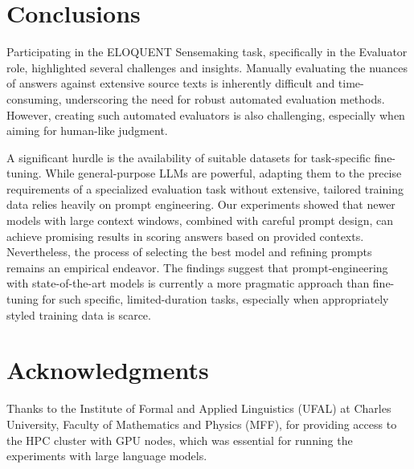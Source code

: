 \documentclass[fleqn,10pt]{olplainarticle}
\begin{document}
\section*{Conclusions}

Participating in the ELOQUENT Sensemaking task, specifically in the Evaluator role, highlighted several challenges and insights. Manually evaluating the nuances of answers against extensive source texts is inherently difficult and time-consuming, underscoring the need for robust automated evaluation methods. However, creating such automated evaluators is also challenging, especially when aiming for human-like judgment.

A significant hurdle is the availability of suitable datasets for task-specific fine-tuning. While general-purpose LLMs are powerful, adapting them to the precise requirements of a specialized evaluation task without extensive, tailored training data relies heavily on prompt engineering. Our experiments showed that newer models with large context windows, combined with careful prompt design, can achieve promising results in scoring answers based on provided contexts. Nevertheless, the process of selecting the best model and refining prompts remains an empirical endeavor. The findings suggest that prompt-engineering with state-of-the-art models is currently a more pragmatic approach than fine-tuning for such specific, limited-duration tasks, especially when appropriately styled training data is scarce.


\section*{Acknowledgments}

Thanks to the Institute of Formal and Applied Linguistics (UFAL) at Charles University, Faculty of Mathematics and Physics (MFF), for providing access to the HPC cluster with GPU nodes, which was essential for running the experiments with large language models.


\end{document}
